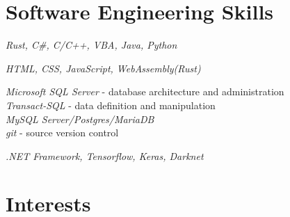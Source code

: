 \documentclass[10pt]{article} %
\begin{document}



\section{Software Engineering Skills}

{
\textit{Rust, C\#, C/C++, VBA, Java, Python}\\
}


{
\textit{HTML, CSS, JavaScript, WebAssembly(Rust)}\\
}


{
\textit{Microsoft SQL Server} - database architecture and administration\\
\textit{Transact-SQL} - data definition and manipulation\\
\textit{MySQL Server/Postgres/MariaDB}\\
\textit{git} - source version control
}


{
\textit{.NET Framework, Tensorflow, Keras, Darknet}
}


\section{Interests}

\end{document}

